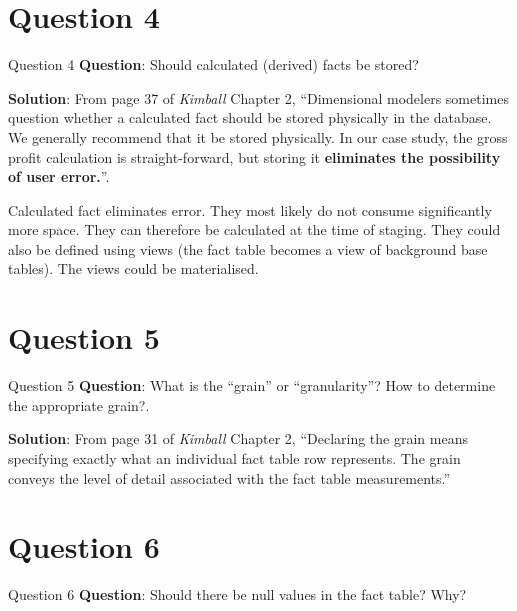 \section*{Question 4}

\begin{frame}[fragile]{Question 4}
	\textbf{Question}: Should calculated (derived) facts be stored?\\\vspace{10pt}
	
	\textbf{Solution}: From page 37 of \textit{Kimball} Chapter 2, ``Dimensional modelers sometimes question whether a calculated fact should be stored physically in the database. We generally recommend that it be stored physically. In our case study, the gross profit calculation is straight-forward, but storing it \textbf{eliminates	the possibility of user error.}''. \\\vspace{5pt}
	
	Calculated fact eliminates error. They most likely do not consume
	significantly more space. They can therefore be calculated at the time of staging. They could also be defined using views (the fact table becomes a view of background base tables). The views could be materialised.
\end{frame}

\section*{Question 5}

\begin{frame}[fragile]{Question 5}
	\textbf{Question}: What is the ``grain'' or ``granularity''? How to determine the appropriate grain?.\\\vspace{10pt}
	
	\textbf{Solution}: From page 31 of \textit{Kimball} Chapter 2, ``Declaring the grain means specifying exactly what an individual fact table row represents.  The grain conveys the level of detail associated with the fact table measurements.''\\\vspace{5pt}
\end{frame}

\section*{Question 6}

\begin{frame}[fragile]{Question 6}
	\textbf{Question}: Should there be null values in the fact table? Why?	
\end{frame}

